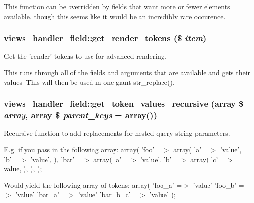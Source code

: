 This function can be overridden by fields that want more or fewer elements available, though this seems like it would be an incredibly rare occurence. \hypertarget{classviews__handler__field_a09c76b4e29ba8b0e6694ba4e341ef609}{
\subsubsection[{get\_\-render\_\-tokens}]{\setlength{\rightskip}{0pt plus 5cm}views\_\-handler\_\-field::get\_\-render\_\-tokens (\$ {\em item})}}
\label{classviews__handler__field_a09c76b4e29ba8b0e6694ba4e341ef609}
Get the 'render' tokens to use for advanced rendering.

This runs through all of the fields and arguments that are available and gets their values. This will then be used in one giant str\_\-replace(). \hypertarget{classviews__handler__field_a27538799840dcae28095352259eb733e}{
\subsubsection[{get\_\-token\_\-values\_\-recursive}]{\setlength{\rightskip}{0pt plus 5cm}views\_\-handler\_\-field::get\_\-token\_\-values\_\-recursive (array \$ {\em array}, \/  array \$ {\em parent\_\-keys} = {\ttfamily array()})}}
\label{classviews__handler__field_a27538799840dcae28095352259eb733e}
Recursive function to add replacements for nested query string parameters.

E.g. if you pass in the following array: array( 'foo' =$>$ array( 'a' =$>$ 'value', 'b' =$>$ 'value', ), 'bar' =$>$ array( 'a' =$>$ 'value', 'b' =$>$ array( 'c' =$>$ value, ), ), );

Would yield the following array of tokens: array( 'foo\_\-a' =$>$ 'value' 'foo\_\-b' =$>$ 'value' 'bar\_\-a' =$>$ 'value' 'bar\_\-b\_\-c' =$>$ 'value' );


